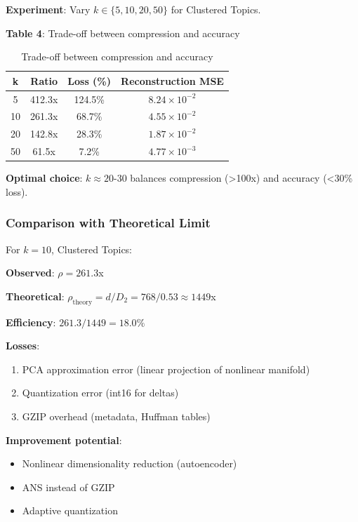 \documentclass[11pt,a4paper]{article}
\begin{document}
\textbf{Experiment}: Vary $k \in \{5, 10, 20, 50\}$ for Clustered Topics.

\textbf{Table 4}: Trade-off between compression and accuracy

\begin{table}[h]
\centering
\small
\begin{tabular}{@{}cccc@{}}
\toprule
\textbf{k} & \textbf{Ratio} & \textbf{Loss (\%)} & \textbf{Reconstruction MSE} \\
\midrule
5 & 412.3x & 124.5\% & $8.24 \times 10^{-2}$ \\
10 & 261.3x & 68.7\% & $4.55 \times 10^{-2}$ \\
20 & 142.8x & 28.3\% & $1.87 \times 10^{-2}$ \\
50 & 61.5x & 7.2\% & $4.77 \times 10^{-3}$ \\
\bottomrule
\end{tabular}
\caption{Trade-off between compression and accuracy}
\end{table}

\textbf{Optimal choice}: $k \approx 20$-30 balances compression (>100x) and accuracy (<30\% loss).

\subsubsection{Comparison with Theoretical Limit}

For $k = 10$, Clustered Topics:

\textbf{Observed}: $\rho = 261.3$x

\textbf{Theoretical}: $\rho_{\text{theory}} = d/D_2 = 768/0.53 \approx 1449$x

\textbf{Efficiency}: $261.3/1449 = 18.0\%$

\textbf{Losses}:
\begin{enumerate}
\item PCA approximation error (linear projection of nonlinear manifold)
\item Quantization error (int16 for deltas)
\item GZIP overhead (metadata, Huffman tables)
\end{enumerate}

\textbf{Improvement potential}:
\begin{itemize}
\item Nonlinear dimensionality reduction (autoencoder)
\item ANS instead of GZIP
\item Adaptive quantization
\end{itemize}
\end{document}
